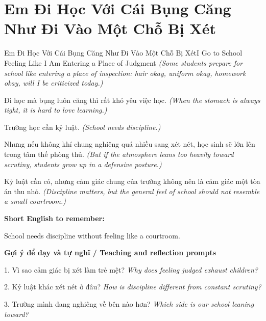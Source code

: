 \section{Em Đi Học Với Cái Bụng Căng Như Đi Vào Một Chỗ Bị Xét}
\begin{truyen}{Em Đi Học Với Cái Bụng Căng Như Đi Vào Một Chỗ Bị Xét}{I Go to School Feeling Like I Am Entering a Place of Judgment}
\textit{(Some students prepare for school like entering a place of inspection: hair okay, uniform okay, homework okay, will I be criticized today.)}

Đi học mà bụng luôn căng thì rất khó yêu việc học.
\textit{(When the stomach is always tight, it is hard to love learning.)}

Trường học cần kỷ luật.
\textit{(School needs discipline.)}

Nhưng nếu không khí chung nghiêng quá nhiều sang xét nét, học sinh sẽ lớn lên trong tâm thế phòng thủ.
\textit{(But if the atmosphere leans too heavily toward scrutiny, students grow up in a defensive posture.)}

\end{truyen}

\begin{baihoc}
Kỷ luật cần có, nhưng cảm giác chung của trường không nên là cảm giác một tòa án thu nhỏ.
\textit{(Discipline matters, but the general feel of school should not resemble a small courtroom.)}
\end{baihoc}

\begin{ghinhoanh}
\textbf{Short English to remember:}

School needs discipline without feeling like a courtroom.

\end{ghinhoanh}

\begin{tuhocnhanh}
\textbf{Gợi ý để dạy và tự nghĩ / Teaching and reflection prompts}

1. Vì sao cảm giác bị xét làm trẻ mệt? \textit{Why does feeling judged exhaust children?}

2. Kỷ luật khác xét nét ở đâu? \textit{How is discipline different from constant scrutiny?}

3. Trường mình đang nghiêng về bên nào hơn? \textit{Which side is our school leaning toward?}
\end{tuhocnhanh}
\ngancach

